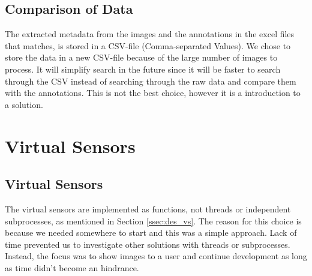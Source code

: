 \documentclass[USenglish]{uit-thesis}
\begin{document}
\subsection{Comparison of Data} \label{ssec:imp_compare}

The extracted metadata from the images and the annotations in the excel files that matches, is stored in a CSV-file (Comma-separated Values). We chose to store the data in a new CSV-file because of the large number of images to process. It will simplify search in the future since it will be faster to search through the CSV instead of searching through the raw data and compare them with the annotations. This is not the best choice, however it is a introduction to a solution.



\section{Virtual Sensors} \label{sec:imp_virsens}
\subsection{Virtual Sensors} %

The virtual sensors are implemented as functions, not threads or independent subprocesses, as mentioned in Section \ref{ssec:des_vs}. The reason for this choice is because we needed somewhere to start and this was a simple approach. Lack of time prevented us to investigate other solutions with threads or subprocesses. Instead, the focus was to show images to a user and continue development as long as time didn't become an hindrance.


\end{document}
